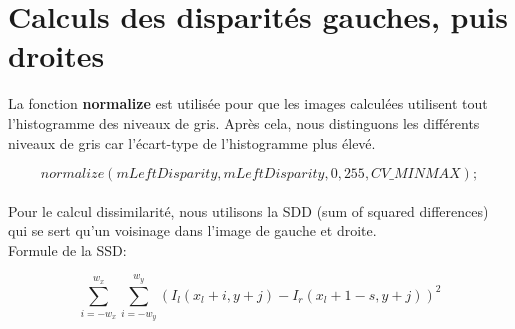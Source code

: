 \documentclass[a4paper,11pt]{article}
\begin{document}
\newpage


\section{Calculs des disparités gauches, puis droites}

La fonction \textbf{normalize} est utilisée pour que les images calculées 
utilisent tout l'histogramme des niveaux de gris. Après cela, nous distinguons 
les différents niveaux de gris car l'écart-type de l'histogramme plus élevé.

$$
normalize(mLeftDisparity, mLeftDisparity, 0, 255, CV\_MINMAX);
$$\\

Pour le calcul dissimilarité, nous utilisons la SDD (sum of squared differences) 
qui se sert qu'un voisinage dans l'image de gauche et droite.\\

Formule de la SSD:

$$
\sum_{i=-w_x}^{w_x} \sum_{i=-w_y}^{w_y} (I_l(x_l+i,y+j)-I_r(x_l+1-s,y+j))^2
$$

\begin{figure}[H]
  \centering
\end{figure}

\newpage
\end{document}
